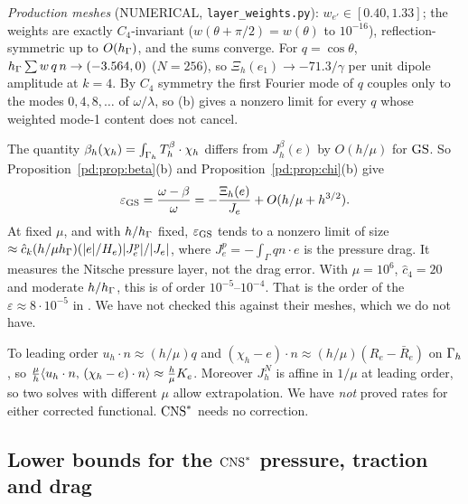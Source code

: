 \noindent\emph{Production meshes} (NUMERICAL, \texttt{layer\_weights.py}): $w_{e'}\in[0.40,1.33]$; the weights are exactly $C_4$-invariant ($w(\theta+\pi/2)=w(\theta)$ to $10^{-16}$), reflection-symmetric up to $O(h_\Gamma)$, and the sums converge. For $q=\cos\theta$, $h_\Gamma\sum w\,q\,n\to(-3.564,0)$ ($N=256$), so $\Xi_h(e_1)\to-71.3/\gamma$ per unit dipole amplitude at $k=4$. By $C_4$ symmetry the first Fourier mode of $q$ couples only to the modes $0,4,8,\dots$ of $\omega/\lambda$, so (b) gives a nonzero limit for every $q$ whose weighted mode-1 content does not cancel.


\begin{remark}\label{pd:rem:eps}
The quantity $\beta_h(\chi_h)=\int_{\Gamma_h}T^\beta_h\cdot\chi_h$ differs from $J^\beta_h(e)$ by $O(h/\mu)$ for $\mathrm{GS}$. So Proposition~\ref{pd:prop:beta}(b) and Proposition~\ref{pd:prop:chi}(b) give
\[
\varepsilon_{\mathrm{GS}}=\frac{\omega-\beta}{\omega}=-\frac{\Xi_h(e)}{J_e}+O(h/\mu+h^{3/2}).
\]
At fixed $\mu$, and with $h/h_\Gamma$ fixed, $\varepsilon_{\mathrm{GS}}$ tends to a nonzero limit of size $\approx\hat c_k(h/\mu h_\Gamma)(|e|/H_e)|J^p_e|/|J_e|$, where $J^p_e=-\int_\Gamma qn\cdot e$ is the pressure drag. It measures the Nitsche pressure layer, not the drag error. With $\mu=10^6$, $\hat c_4=20$ and moderate $h/h_\Gamma$, this is of order $10^{-5}$--$10^{-4}$. That is the order of the $\varepsilon\approx8\cdot10^{-5}$ in \cite[Table~1b]{GjerdeScott2024}. We have not checked this against their meshes, which we do not have.
\end{remark}

\begin{remark}\label{pd:rem:correct}
To leading order $u_h\cdot n\approx(h/\mu)q$ and $(\chi_h-e)\cdot n\approx(h/\mu)(R_e-\bar R_e)$ on $\Gamma_h$, so $\frac\mu h\langle u_h\cdot n,\, (\chi_h-e)\cdot n\rangle\approx\frac h\mu K_e$. Moreover $J^N_h$ is affine in $1/\mu$ at leading order, so two solves with different $\mu$ allow extrapolation. We have \emph{not} proved rates for either corrected functional. $\mathrm{CNS}^\ast$ needs no correction.
\end{remark}


\subsection{Lower bounds for the $\mathrm{CNS}^\ast$ pressure, traction and drag}\label{pd:sec:lower}


